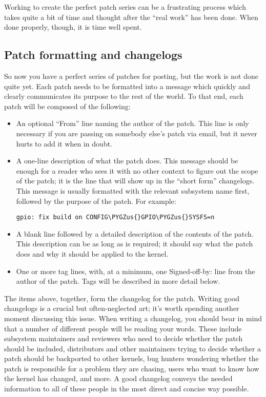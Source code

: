\documentclass[a4paper,8pt,english]{sphinxmanual}
\def\PYGZus{\char`\_}
\begin{document}
Working to create the perfect patch series can be a frustrating process
which takes quite a bit of time and thought after the ``real work'' has been
done.  When done properly, though, it is time well spent.


\subsection{Patch formatting and changelogs}
\label{process/5.Posting:patch-formatting-and-changelogs}
So now you have a perfect series of patches for posting, but the work is
not done quite yet.  Each patch needs to be formatted into a message which
quickly and clearly communicates its purpose to the rest of the world.  To
that end, each patch will be composed of the following:
\begin{itemize}
\item {} 
An optional ``From'' line naming the author of the patch.  This line is
only necessary if you are passing on somebody else's patch via email,
but it never hurts to add it when in doubt.

\item {} 
A one-line description of what the patch does.  This message should be
enough for a reader who sees it with no other context to figure out the
scope of the patch; it is the line that will show up in the ``short form''
changelogs.  This message is usually formatted with the relevant
subsystem name first, followed by the purpose of the patch.  For
example:

\begin{Verbatim}[commandchars=\\\{\}]
gpio: fix build on CONFIG\PYGZus{}GPIO\PYGZus{}SYSFS=n
\end{Verbatim}

\item {} 
A blank line followed by a detailed description of the contents of the
patch.  This description can be as long as is required; it should say
what the patch does and why it should be applied to the kernel.

\item {} 
One or more tag lines, with, at a minimum, one Signed-off-by: line from
the author of the patch.  Tags will be described in more detail below.

\end{itemize}

The items above, together, form the changelog for the patch.  Writing good
changelogs is a crucial but often-neglected art; it's worth spending
another moment discussing this issue.  When writing a changelog, you should
bear in mind that a number of different people will be reading your words.
These include subsystem maintainers and reviewers who need to decide
whether the patch should be included, distributors and other maintainers
trying to decide whether a patch should be backported to other kernels, bug
hunters wondering whether the patch is responsible for a problem they are
chasing, users who want to know how the kernel has changed, and more.  A
good changelog conveys the needed information to all of these people in the
most direct and concise way possible.
\end{document}
